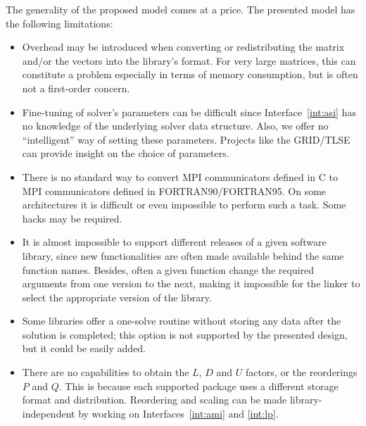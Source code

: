 \documentclass[acmtoms,acmnow]{acmtrans2m}
\begin{document}
The generality of the proposed model comes at a price. The presented model has the following
limitations:
\begin{itemize}
\item
Overhead may be introduced when converting or redistributing the
matrix and/or the vectors into the library's format. For very large
matrices, this can constitute a problem especially in terms of
memory consumption, but is often not a first-order concern.
\item
Fine-tuning of solver's parameters can be
difficult since Interface~\ref{int:asi} has no knowledge of the underlying
solver data structure. Also, we offer no ``intelligent'' way of setting these
parameters.  Projects like the GRID/TLSE~\cite{dayde04overview} can provide
insight on the choice of parameters.

\item There
  is no standard way to
  convert MPI communicators defined in C to MPI communicators defined
  in FORTRAN90/FORTRAN95. On some architectures it is difficult or even
  impossible to perform such a task. Some hacks may be required.

\item
It is almost impossible to support different releases of a given software
library, since new functionalities are often made available behind the same
function names. Besides, often a given function change the required arguments
from one version to the next, making it impossible for the linker to select
the appropriate version of the library.

%
%
\item
Some libraries offer a one-solve routine without storing any data after the
solution is completed; this option is not  supported
by the presented design, but it could be easily added.

\item
There are no capabilities to obtain the $L$, $D$ and $U$ factors, or the
reorderings $P$ and $Q$. This is because each supported package uses a
different storage format and distribution. Reordering and scaling can be made
library-independent by working on Interfaces~\ref{int:ami} and \ref{int:lp}.


\end{itemize}
\end{document}
